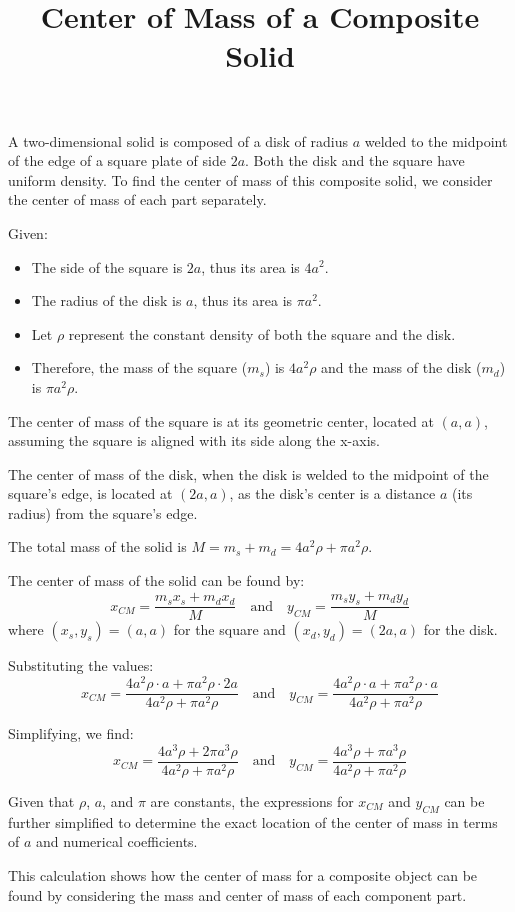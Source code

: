 \documentclass{article}
\begin{document}
\title{Center of Mass of a Composite Solid}
\date{}
\maketitle

A two-dimensional solid is composed of a disk of radius $a$ welded to the midpoint of the edge of a square plate of side $2a$. Both the disk and the square have uniform density. To find the center of mass of this composite solid, we consider the center of mass of each part separately.

Given:
\begin{itemize}
    \item The side of the square is $2a$, thus its area is $4a^2$.
    \item The radius of the disk is $a$, thus its area is $\pi a^2$.
    \item Let $\rho$ represent the constant density of both the square and the disk.
    \item Therefore, the mass of the square ($m_s$) is $4a^2\rho$ and the mass of the disk ($m_d$) is $\pi a^2\rho$.
\end{itemize}

The center of mass of the square is at its geometric center, located at $(a, a)$, assuming the square is aligned with its side along the x-axis.

The center of mass of the disk, when the disk is welded to the midpoint of the square's edge, is located at $(2a, a)$, as the disk's center is a distance $a$ (its radius) from the square's edge.

The total mass of the solid is $M = m_s + m_d = 4a^2\rho + \pi a^2\rho$.

The center of mass of the solid can be found by:
\[ x_{CM} = \frac{m_s x_s + m_d x_d}{M} \quad \text{and} \quad y_{CM} = \frac{m_s y_s + m_d y_d}{M} \]
where $(x_s, y_s) = (a, a)$ for the square and $(x_d, y_d) = (2a, a)$ for the disk.

Substituting the values:
\[ x_{CM} = \frac{4a^2\rho \cdot a + \pi a^2\rho \cdot 2a}{4a^2\rho + \pi a^2\rho} \quad \text{and} \quad y_{CM} = \frac{4a^2\rho \cdot a + \pi a^2\rho \cdot a}{4a^2\rho + \pi a^2\rho} \]

Simplifying, we find:
\[ x_{CM} = \frac{4a^3\rho + 2\pi a^3\rho}{4a^2\rho + \pi a^2\rho} \quad \text{and} \quad y_{CM} = \frac{4a^3\rho + \pi a^3\rho}{4a^2\rho + \pi a^2\rho} \]

Given that $\rho$, $a$, and $\pi$ are constants, the expressions for $x_{CM}$ and $y_{CM}$ can be further simplified to determine the exact location of the center of mass in terms of $a$ and numerical coefficients.

This calculation shows how the center of mass for a composite object can be found by considering the mass and center of mass of each component part.
\end{document}

